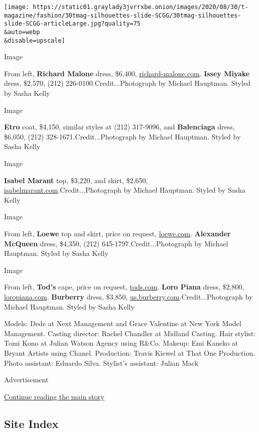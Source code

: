\texttt{[image: https://static01.graylady3jvrrxbe.onion/images/2020/08/30/t-magazine/fashion/30tmag-silhouettes-slide-SCGG/30tmag-silhouettes-slide-SCGG-articleLarge.jpg?quality=75\\\&auto=webp\\\&disable=upscale]}

Image

From left, \textbf{Richard Malone} dress, \$6,400,
\href{http://www.richard-malone.com/}{richard-malone.com}. \textbf{Issey
Miyake} dress, \$2,570, (212) 226-0100.Credit...Photograph by Michael
Hauptman. Styled by Sasha Kelly

Image

\textbf{Etro} coat, \$4,150, similar styles at (212) 317-9096, and
\textbf{Balenciaga} dress, \$6,050, (212) 328-1671.Credit...Photograph
by Michael Hauptman. Styled by Sasha Kelly

Image

\textbf{Isabel Marant} top, \$3,220, and skirt, \$2,650,
\href{https://www.isabelmarant.com/us}{isabelmarant.com}.Credit...Photograph
by Michael Hauptman. Styled by Sasha Kelly

Image

From left, \textbf{Loewe} top and skirt, price on request,
\href{https://www.loewe.com/usa/en/home}{loewe.com}. \textbf{Alexander
McQueen} dress, \$4,350, (212) 645-1797.Credit...Photograph by Michael
Hauptman. Styled by Sasha Kelly

Image

From left, \textbf{Tod's} cape, price on request,
\href{http://tods.com/}{tods.com}. \textbf{Loro Piana} dress, \$2,800,
\href{http://loropiana.com/}{loropiana.com}. \textbf{Burberry} dress,
\$3,850,
\href{http://us.burberry.com/}{us.burberry.com}.Credit...Photograph by
Michael Hauptman. Styled by Sasha Kelly

Models: Dede at Next Management and Grace Valentine at New York Model
Management. Casting director: Rachel Chandler at Midland Casting. Hair
stylist: Tomi Kono at Julian Watson Agency using R\&Co. Makeup: Emi
Kaneko at Bryant Artists using Chanel. Production: Travis Kiewel at That
One Production. Photo assistant: Eduardo Silva. Stylist's assistant:
Julian Mack

Advertisement

\protect\hyperlink{after-bottom}{Continue reading the main story}

\hypertarget{site-index}{%
\subsection{Site Index}\label{site-index}}

